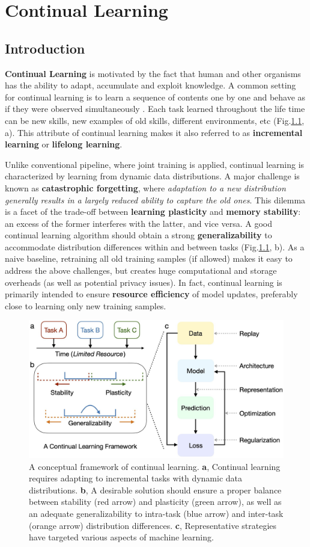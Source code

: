 \chapter{Continual Learning}
\section{Introduction}
\textbf{Continual Learning} is motivated by the fact that human and other organisms has the ability to adapt, accumulate and exploit knowledge. A common setting for continual learning is to learn a sequence of contents one by one and behave as if they were observed simultaneously \citep{wang2023comprehensive}. Each task learned throughout the life time can be new skills, new examples of old skills, different environments, etc (Fig.\ref{fig:cl_1}, a). This attribute of continual learning makes it also referred to as \textbf{incremental learning} or \textbf{lifelong learning}.

Unlike conventional pipeline, where joint training is applied, continual learning is characterized by learning from dynamic data distributions. A major challenge is known as \textbf{catastrophic forgetting}, where \textit{adaptation to a new distribution generally results in a largely reduced ability to capture the old ones}. This dilemma is a facet of the trade-off between \textbf{learning plasticity} and \textbf{memory stability}: an excess of the former interferes with the latter, and vice versa. A good continual learning algorithm should obtain a strong \textbf{generalizability} to accommodate distribution differences within and between tasks (Fig.\ref{fig:cl_1}, b). As a naive baseline, retraining all old training samples (if allowed) makes it easy to address the above challenges, but creates huge computational and storage overheads (as well as potential privacy issues). In fact, continual learning is primarily intended to ensure \textbf{resource efficiency} of model updates, preferably close to learning only new training samples.

\begin{figure}[H]
    \centering
    \includegraphics[width=0.7\linewidth]{imgs/continual_learning/cl_1.png}
    \caption{A conceptual framework of continual learning. \textbf{a}, Continual learning requires adapting to incremental tasks with dynamic data distributions. \textbf{b}, A desirable solution should ensure a proper balance between stability (red arrow) and plasticity (green arrow), as well as an adequate generalizability to intra-task (blue arrow) and inter-task (orange arrow) distribution differences. \textbf{c}, Representative strategies have targeted various aspects of machine learning.}
    \label{fig:cl_1}
\end{figure}

